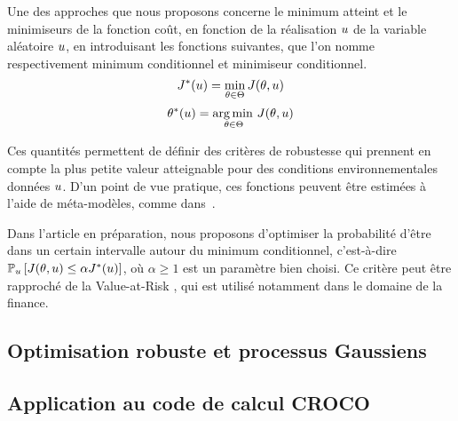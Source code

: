 \documentclass[../../Main_ManuscritThese.tex]{subfiles}
\begin{document}
Une des approches que nous proposons concerne le minimum atteint et le minimiseurs de la fonction coût, en fonction de la réalisation $u$ de la variable aléatoire $u$, en introduisant les fonctions suivantes, que l'on nomme respectivement minimum conditionnel et minimiseur conditionnel.
\begin{equation}
  \label{eq:Jstar}
  J^*(u) = \min_{\theta\in\Theta} J(\theta,u)
\end{equation}
\begin{equation}
  \label{eq:Kstar}
  \theta^*(u) = \operatorname*{arg\,min \,}_{\theta\in \Theta}J(\theta,u)
\end{equation}

Ces quantités permettent de définir des critères de robustesse qui prennent en compte la plus petite valeur atteignable pour des conditions environnementales données $u$.
D'un point de vue pratique, ces fonctions peuvent être estimées à l'aide de méta-modèles, comme dans~\cite{ginsbourger_bayesian_2014}.
 
Dans l'article en préparation, nous proposons d'optimiser la probabilité d'être dans un certain intervalle autour du minimum conditionnel, c'est-à-dire $\mathbb{P}_{u}\left[J(\theta,u) \leq \alpha J^*(u) \right]$, où $\alpha \geq 1$ est un paramètre bien choisi. Ce critère peut être rapproché de la Value-at-Risk \cite{rockafellar_deviation_2002}, qui est utilisé notamment dans le domaine de la finance.

\subsection*{Optimisation robuste et processus Gaussiens}
\subsection*{Application au code de calcul CROCO}
\end{document}
